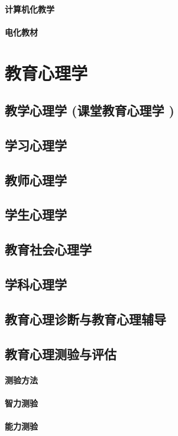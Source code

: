 \documentclass[UTF8]{../../ApplicationUniverse}
\begin{document}
    \subsubsection{计算机化教学}
    \subsubsection{电化教材}



\chapter{教育心理学}
\section{教学心理学 (课堂教育心理学 )}
\section{学习心理学}
\section{教师心理学}
\section{学生心理学}
\section{教育社会心理学}
\section{学科心理学}
\section{教育心理诊断与教育心理辅导}
\section{教育心理测验与评估}
    \subsubsection{测验方法}
    \subsubsection{智力测验}
    \subsubsection{能力测验}
\end{document}
